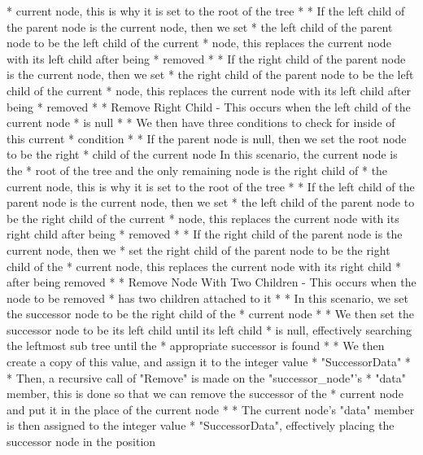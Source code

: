 \begin{highlight}
\begin{code}
*             current node, this is why it is set to the root of the tree
*           * If the left child of the parent node is the current node, then we set 
*             the left child of the parent node to be the left child of the current 
*             node, this replaces the current node with its left child after being 
*             removed
*           * If the right child of the parent node is the current node, then we set 
*             the right child of the parent node to be the left child of the current 
*             node, this replaces the current node with its left child after being 
*             removed
*       * Remove Right Child - This occurs when the left child of the current node 
*         is null
*         * We then have three conditions to check for inside of this current
*           condition
*           * If the parent node is null, then we set the root node to be the right 
*             child of the current node In this scenario, the current node is the 
*             root of the tree and the only remaining node is the right child of 
*             the current node, this is why it is set to the root of the tree
*           * If the left child of the parent node is the current node, then we set 
*             the left child of the parent node to be the right child of the current 
*             node, this replaces the current node with its right child after being 
*             removed
*           * If the right child of the parent node is the current node, then we 
*             set the right child of the parent node to be the right child of the 
*             current node, this replaces the current node with its right child 
*             after being removed
*       * Remove Node With Two Children - This occurs when the node to be removed 
*         has two children attached to it
*         * In this scenario, we set the successor node to be the right child of the 
*           current node
*         * We then set the successor node to be its left child until its left child 
*           is null, effectively searching the leftmost sub tree until the 
*           appropriate successor is found
*         * We then create a copy of this value, and assign it to the integer value 
*           "SuccessorData"
*         * Then, a recursive call of "Remove" is made on the "successor_node"'s 
*           "data" member, this is done so that we can remove the successor of the 
*           current node and put it in the place of the current node
*         * The current node's "data" member is then assigned to the integer value 
*           "SuccessorData", effectively placing the successor node in the position 

\end{code}
\end{highlight}
